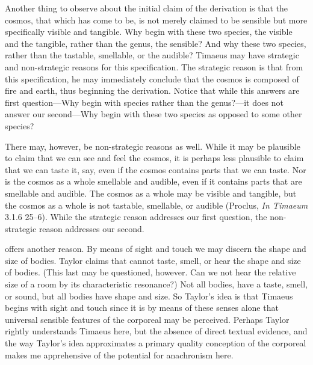 Another thing to observe about the initial claim of the derivation is that the cosmos, that which has come to be, is not merely claimed to be sensible but more specifically visible and tangible. Why begin with these two species, the visible and the tangible, rather than the genus, the sensible? And why these two species, rather than the tastable, smellable, or the audible?  Timaeus may have strategic and non-strategic reasons for this specification. The strategic reason is that from this specification, he may immediately conclude that the cosmos is composed of fire and earth, thus beginning the derivation. Notice that while this answers are first question---Why begin with species rather than the genus?---it does not answer our second---Why begin with these two species as opposed to some other species? 

There may, however, be non-strategic reasons as well. While it may be plausible to claim that we can see and feel the cosmos, it is perhaps less plausible to claim that we can taste it, say, even if the cosmos contains parts that we can taste. Nor is the cosmos as a whole smellable and audible, even if it contains parts that are smellable and audible. The cosmos as a whole may be visible and tangible, but the cosmos as a whole is not tastable, smellable, or audible (Proclus, \emph{In Timaeum} 3.1.6 25--6). While the strategic reason addresses our first question, the non-strategic reason addresses our second. 

\citet[93]{Taylor:1928qb} offers another reason. By means of sight and touch we may discern the shape and size of bodies. Taylor claims that cannot taste, smell, or hear the shape and size of bodies. (This last may be questioned, however. Can we not hear the relative size of a room by its characteristic resonance?) Not all bodies, have a taste, smell, or sound, but all bodies have shape and size. So Taylor's idea is that Timaeus begins with sight and touch since it is by means of these senses alone that universal sensible features of the corporeal may be perceived. Perhaps Taylor rightly understands Timaeus here, but the absence of direct textual evidence, and the way Taylor's idea approximates a primary quality conception of the corporeal makes me apprehensive of the potential for anachronism here.

